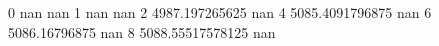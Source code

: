 0 nan nan
1 nan nan
2 4987.197265625 nan
4 5085.4091796875 nan
6 5086.16796875 nan
8 5088.55517578125 nan

